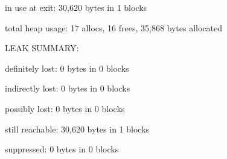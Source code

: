 \documentclass[a4paper,12pt]{article}
\begin{document}
\noindent \begin{justify}
\hspace*{0.49in}\hspace*{0.49in}in use at exit: 30,620 bytes in 1 blocks
\end{justify}\par


\noindent \begin{justify}
\hspace*{0.49in}\hspace*{0.49in}total heap usage: 17 allocs, 16 frees, 35,868 bytes allocated
\end{justify}\par


\vspace{\baselineskip}

\noindent \begin{justify}
\hspace*{0.49in}\hspace*{0.49in}LEAK SUMMARY:
\end{justify}\par


\noindent \begin{justify}
\hspace*{0.49in}\hspace*{0.49in}definitely lost: 0 bytes in 0 blocks
\end{justify}\par


\noindent \begin{justify}
\hspace*{0.49in}\hspace*{0.49in}indirectly lost: 0 bytes in 0 blocks
\end{justify}\par


\noindent \begin{justify}
\hspace*{0.49in}\hspace*{0.49in}possibly lost: 0 bytes in 0 blocks
\end{justify}\par


\noindent \begin{justify}
\hspace*{0.49in}\hspace*{0.49in}still reachable: 30,620 bytes in 1 blocks
\end{justify}\par


\noindent \begin{justify}
\hspace*{0.49in}\hspace*{0.49in}suppressed: 0 bytes in 0 blocks
\end{justify}\par
\end{document}
